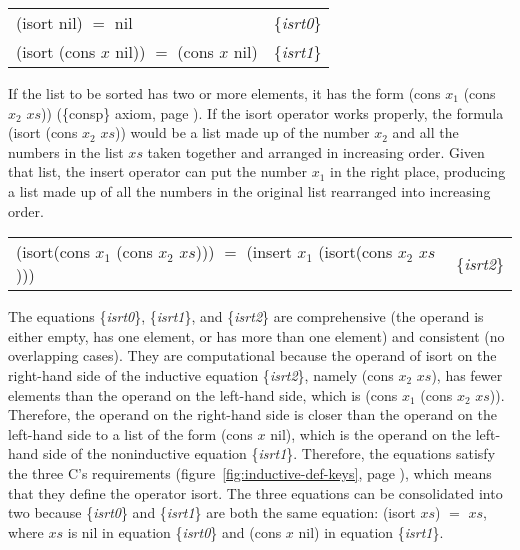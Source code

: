 \begin{center}
\label{eq:isrt0}\label{eq:isrt1}
\begin{tabular}{ll}
\textsf{(isort nil) $=$ nil}                       & \{\emph{isrt0}\} \\
\textsf{(isort (cons $x$ nil)) $=$ (cons $x$ nil)} & \{\emph{isrt1}\} \\
\end{tabular}
\end{center}

If the list to be sorted has two or more elements,
it has the form \textsf{(cons $x_1$ (cons $x_2$ $xs$))}
(\{consp\} axiom, page \pageref{consp-axiom}).
If the \textsf{isort} operator works properly,
the formula \textsf{(isort (cons $x_2$ $xs$))} would be
a list made up of the number $x_2$ and all the numbers in the list $xs$
taken together and
arranged in increasing order.
Given that list, the \textsf{insert} operator can put the number $x_1$ in
the right place, producing a list made up of all the
numbers in the original list rearranged into increasing order.

\begin{center}
\label{eq:isrt2}
\begin{tabular}{ll}
\textsf{(isort(cons $x_1$ (cons $x_2$ $xs$))) $=$ (insert $x_1$ (isort(cons $x_2$ $xs$)))} & \{\emph{isrt2}\} \\
\end{tabular}
\end{center}

The equations \{\emph{isrt0}\}, \{\emph{isrt1}\}, and \{\emph{isrt2}\}
are comprehensive (the operand is either empty, has one element, or
has more than one element) and consistent (no overlapping cases).
They are computational because the operand of \textsf{isort}
on the right-hand side of the inductive equation
\{\emph{isrt2}\}, namely \textsf{(cons $x_2$ $xs$)},
has fewer elements than the operand on the left-hand side,
which is \textsf{(cons $x_1$ (cons $x_2$ $xs$))}.
Therefore, the operand on the right-hand side is
closer than the operand on the left-hand side to a list
of the form \textsf{(cons $x$ nil)}, which is
the operand on the left-hand side of the
noninductive equation \{\emph{isrt1}\}.
Therefore, the equations satisfy the three C's requirements %
(figure~\ref{fig:inductive-def-keys}, page \pageref{fig:inductive-def-keys}),
which means that they define the operator \textsf{isort}.
The three equations can be consolidated into two because
\{\emph{isrt0}\} and \{\emph{isrt1}\}
are both the same equation: \textsf{(isort $xs$)} $=$ $xs$,
where $xs$ is \textsf{nil} in equation \{\emph{isrt0}\}
and \textsf{(cons $x$ nil)} in equation \{\emph{isrt1}\}.

